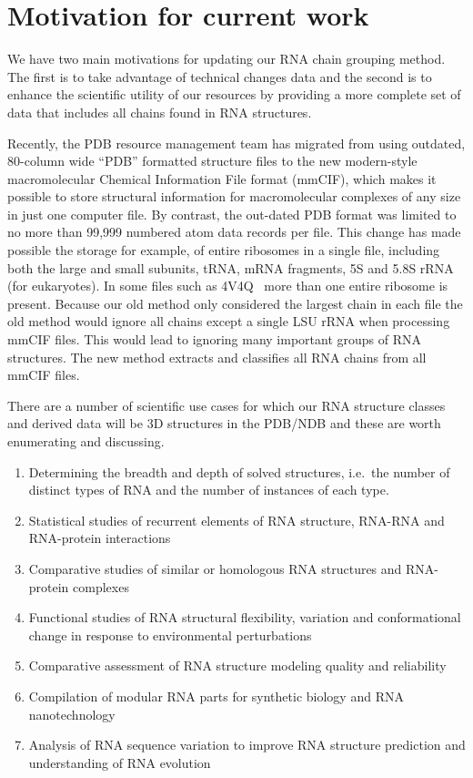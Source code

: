 \section{Motivation for current work}

We have two main motivations for updating our RNA chain grouping method. The
first is to take advantage of technical changes data and the second is to
enhance the scientific utility of our resources by providing a more complete set
of data that includes all chains found in RNA structures.

Recently, the PDB resource management team has migrated from using outdated,
80-column wide ``PDB'' formatted structure files to the new modern-style
macromolecular Chemical Information File format (mmCIF), which makes it possible
to store structural information for macromolecular complexes of any size in just
one computer file. By contrast, the out-dated PDB format was limited to no more
than 99,999 numbered atom data records per file. This change has made possible
the storage for example, of entire ribosomes in a single file, including both
the large and small subunits, tRNA, mRNA fragments, 5S and 5.8S rRNA (for
eukaryotes). In some files such as 4V4Q~\cite{Schuwirth2005} more than one
entire ribosome is present. Because our old method only considered the largest
chain in each file the old method would ignore all chains except a single LSU
rRNA when processing mmCIF files. This would lead to ignoring many important
groups of RNA structures. The new method extracts and classifies all RNA chains
from all mmCIF files.

There are a number of scientific use cases for which our RNA structure classes
and derived data will be  3D structures in the PDB/NDB and these are worth
enumerating and discussing.

\begin{enumerate}
  \item Determining the breadth and depth of solved structures, i.e.\ the number of
    distinct types of RNA and the number of instances of each type.

  \item Statistical studies of recurrent elements of RNA structure, RNA-RNA and
    RNA-protein interactions

  \item Comparative studies of similar or homologous RNA structures and
    RNA-protein complexes

  \item Functional studies of RNA structural flexibility, variation and
    conformational change in response to environmental perturbations

  \item Comparative assessment of RNA structure modeling quality and reliability

  \item Compilation of modular RNA parts for synthetic biology and RNA
    nanotechnology

  \item Analysis of RNA sequence variation to improve RNA structure prediction
    and understanding of RNA evolution
\end{enumerate}

